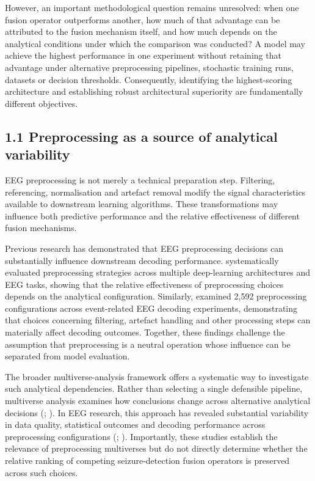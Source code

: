 \documentclass[11pt,a4paper]{article}
\begin{document}
However, an important methodological question remains unresolved: when one fusion
operator outperforms another, how much of that advantage can be attributed to the fusion
mechanism itself, and how much depends on the analytical conditions under which the
comparison was conducted? A model may achieve the highest performance in one experiment
without retaining that advantage under alternative preprocessing pipelines, stochastic
training runs, datasets or decision thresholds. Consequently, identifying the
highest-scoring architecture and establishing robust architectural superiority are
fundamentally different objectives.

\subsection{1.1 Preprocessing as a source of analytical variability}\label{preprocessing-as-a-source-of-analytical-variability}

EEG preprocessing is not merely a technical preparation step. Filtering, referencing,
normalisation and artefact removal modify the signal characteristics available to
downstream learning algorithms. These transformations may influence both predictive
performance and the relative effectiveness of different fusion mechanisms.

Previous research has demonstrated that EEG preprocessing decisions can substantially
influence downstream decoding performance. \citet{Del_Pup_2025} systematically evaluated
preprocessing strategies across multiple deep-learning architectures and EEG tasks,
showing that the relative effectiveness of preprocessing choices depends on the analytical
configuration. Similarly, \citet{Kessler_2025} examined 2,592 preprocessing
configurations across event-related EEG decoding experiments, demonstrating that choices
concerning filtering, artefact handling and other processing steps can materially affect
decoding outcomes. Together, these findings challenge the assumption that preprocessing is
a neutral operation whose influence can be separated from model evaluation.

The broader multiverse-analysis framework offers a systematic way to investigate such
analytical dependencies. Rather than selecting a single defensible pipeline, multiverse
analysis examines how conclusions change across alternative analytical decisions (\citealp{Steegen_2016}; \citealp{Clayson_2024}). In EEG research, this approach has revealed substantial
variability in data quality, statistical outcomes and decoding performance across
preprocessing configurations (\citealp{Kessler_2025}; \citealp{Soskic_2024}).
Importantly, these studies establish the relevance of preprocessing multiverses but do not
directly determine whether the relative ranking of competing seizure-detection fusion
operators is preserved across such choices.
\end{document}
